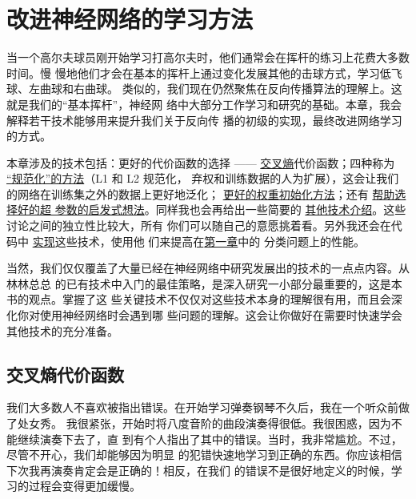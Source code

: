 
\chapter{改进神经网络的学习方法}
\label{ch:ImprovingTheWayNeuralNetworksLearn}

当一个高尔夫球员刚开始学习打高尔夫时，他们通常会在挥杆的练习上花费大多数时间。慢
慢地他们才会在基本的挥杆上通过变化发展其他的击球方式，学习低飞球、左曲球和右曲球。
类似的，我们现在仍然聚焦在反向传播算法的理解上。这就是我们的``基本挥杆''，神经网
络中大部分工作学习和研究的基础。本章，我会解释若干技术能够用来提升我们关于反向传
播的初级的实现，最终改进网络学习的方式。

本章涉及的技术包括：更好的代价函数的选择 ——
\hyperref[sec:the_cross-entropy_cost_function]{交叉熵}代价函数；四种称为%
\hyperref[sec:overfitting_and_regularization]{``规范化''的方法}（L1 和 L2 规范化，
  弃权和训练数据的人为扩展），这会让我们的网络在训练集之外的数据上更好地泛化；%
\hyperref[sec:weight_initialization]{更好的权重初始化方法}；还有%
\hyperref[sec:how_to_choose_a_neural_network's_hyper-parameters]{帮助选择好的超
  参数的启发式想法}。同样我也会再给出一些简要的%
\hyperref[sec:other_techniques]{其他技术介绍}。这些讨论之间的独立性比较大，所有
你们可以随自己的意愿挑着看。另外我还会在代码中%
\hyperref[sec:handwriting_recognition_revisited_the_code]{实现}这些技术，使用他
们来提高在\hyperref[ch:UsingNeuralNetsToRecognizeHandwrittenDigits]{第一章}中的
分类问题上的性能。

当然，我们仅仅覆盖了大量已经在神经网络中研究发展出的技术的一点点内容。从林林总总
的已有技术中入门的最佳策略，是深入研究一小部分最重要的，这是本书的观点。掌握了这
些关键技术不仅仅对这些技术本身的理解很有用，而且会深化你对使用神经网络时会遇到哪
些问题的理解。这会让你做好在需要时快速学会其他技术的充分准备。

\section{交叉熵代价函数}
\label{sec:the_cross-entropy_cost_function}

我们大多数人不喜欢被指出错误。在开始学习弹奏钢琴不久后，我在一个听众前做了处女秀。
我很紧张，开始时将八度音阶的曲段演奏得很低。我很困惑，因为不能继续演奏下去了，直
到有个人指出了其中的错误。当时，我非常尴尬。不过，尽管不开心，我们却能够因为明显
的犯错快速地学习到正确的东西。你应该相信下次我再演奏肯定会是正确的！相反，在我们
的错误不是很好地定义的时候，学习的过程会变得更加缓慢。

